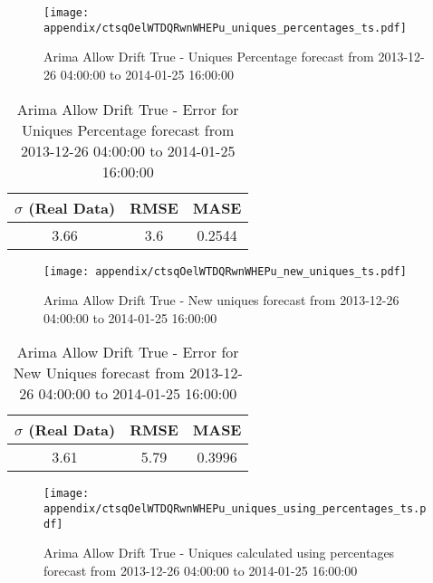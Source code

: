 \begin{figure}[H] \begin{center} \leavevmode
\texttt{[image: appendix/ctsqOelWTDQRwnWHEPu\_uniques\_percentages\_ts.pdf]} \caption{
Arima Allow Drift True - Uniques Percentage forecast from 2013-12-26 04:00:00 to 2014-01-25 16:00:00} \label{fig:appendix/ctsqOelWTDQRwnWHEPu_uniques_percentages_ts.pdf} \end{center}
\end{figure}

\begin{table}[H]
\centering
\footnotesize
\begin{tabular}{ccc}
$\sigma$ (Real Data) & RMSE & MASE   \\ \hline
3.66 & 3.6 & 0.2544 \\
\end{tabular}

\vspace{0.5cm}

\caption{
Arima Allow Drift True - Error for Uniques Percentage forecast from 2013-12-26 04:00:00 to 2014-01-25 16:00:00}
\end{table}

\begin{figure}[H] \begin{center} \leavevmode
\texttt{[image: appendix/ctsqOelWTDQRwnWHEPu\_new\_uniques\_ts.pdf]} \caption{
Arima Allow Drift True - New uniques forecast from 2013-12-26 04:00:00 to 2014-01-25 16:00:00} \label{fig:appendix/ctsqOelWTDQRwnWHEPu_new_uniques_ts.pdf} \end{center}
\end{figure}

\begin{table}[H]
\centering
\footnotesize
\begin{tabular}{ccc}
$\sigma$ (Real Data) & RMSE & MASE   \\ \hline
3.61 & 5.79 & 0.3996 \\
\end{tabular}

\vspace{0.5cm}

\caption{
Arima Allow Drift True - Error for New Uniques forecast from 2013-12-26 04:00:00 to 2014-01-25 16:00:00}
\end{table}

\begin{figure}[H] \begin{center} \leavevmode
\texttt{[image: appendix/ctsqOelWTDQRwnWHEPu\_uniques\_using\_percentages\_ts.pdf]} \caption{
Arima Allow Drift True - Uniques calculated using percentages forecast from 2013-12-26 04:00:00 to 2014-01-25 16:00:00} \label{fig:appendix/ctsqOelWTDQRwnWHEPu_uniques_using_percentages_ts.pdf} \end{center}
\end{figure}

